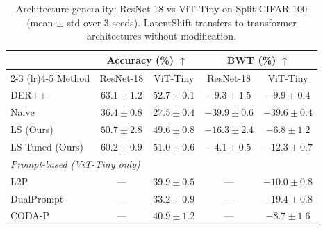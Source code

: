 \begin{table}[t]
\centering
\caption{Architecture generality: ResNet-18 vs ViT-Tiny on Split-CIFAR-100 (mean $\pm$ std over 3 seeds). LatentShift transfers to transformer architectures without modification.}
\label{tab:vit}
\small
\begin{tabular}{lcccc}
\toprule
 & \multicolumn{2}{c}{Accuracy (\%) $\uparrow$} & \multicolumn{2}{c}{BWT (\%) $\uparrow$} \\
\cmidrule(lr){2-3} \cmidrule(lr){4-5}
Method & ResNet-18 & ViT-Tiny & ResNet-18 & ViT-Tiny \\
\midrule
DER++ & $63.1 \pm 1.2$ & $52.7 \pm 0.1$ & $-9.3 \pm 1.5$ & $-9.9 \pm 0.4$ \\
Naive & $36.4 \pm 0.8$ & $27.5 \pm 0.4$ & $-39.9 \pm 0.6$ & $-39.6 \pm 0.4$ \\
\midrule
LS (Ours) & $50.7 \pm 2.8$ & $49.6 \pm 0.8$ & $-16.3 \pm 2.4$ & $-6.8 \pm 1.2$ \\
LS-Tuned (Ours) & $60.2 \pm 0.9$ & $51.0 \pm 0.6$ & $-4.1 \pm 0.5$ & $-12.3 \pm 0.7$ \\
\midrule
\multicolumn{5}{l}{\textit{Prompt-based (ViT-Tiny only)}} \\
L2P & --- & $39.9 \pm 0.5$ & --- & $-10.0 \pm 0.8$ \\
DualPrompt & --- & $33.2 \pm 0.9$ & --- & $-19.4 \pm 0.8$ \\
CODA-P & --- & $40.9 \pm 1.2$ & --- & $-8.7 \pm 1.6$ \\
\bottomrule
\end{tabular}
\end{table}